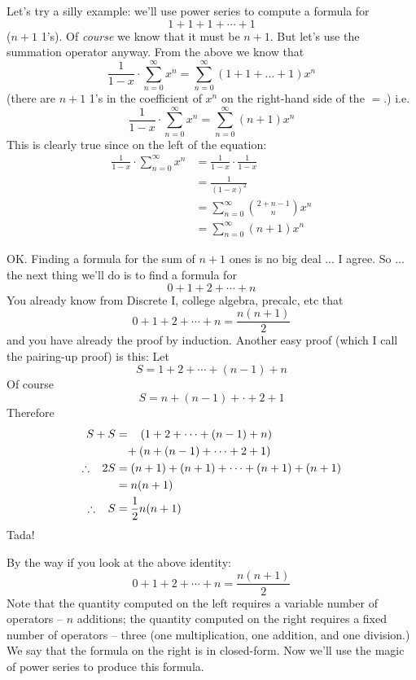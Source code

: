 Let's try a silly example:
we'll use power series to compute a formula for 
\[
1 + 1 + 1 + \cdots + 1
\]
($n+1$ 1's). Of \textit{course} we know that it must be $n+1$.
But let's use the summation operator anyway.
From the above we know that
\[
\frac{1}{1-x} \cdot \sum_{n=0}^\infty x^n = 
\sum_{n=0}^\infty (1 + 1 + \ldots + 1) x^n
\]
(there are $n + 1$ 1's in the coefficient of $x^n$ on the right-hand
side of the $=$.)
i.e.
\[
\frac{1}{1-x} \cdot \sum_{n=0}^\infty x^n = 
\sum_{n=0}^\infty (n + 1) x^n
\]
This is clearly true since on the left of the equation:
\begin{align*}
\frac{1}{1-x} \cdot \sum_{n=0}^\infty x^n 
&= \frac{1}{1-x} \cdot \frac{1}{1-x} \\
&= \frac{1}{(1-x)^2} \\
&= \sum_{n=0}^\infty \binom{2 + n - 1}{n} x^n \\
&= \sum_{n=0}^\infty (n+1) x^n
\end{align*}

OK.
Finding a formula for the sum of $n+1$ ones is no big deal ... I agree.
So ... the next thing we'll do is to find a formula for
\[
0 + 1 + 2 + \cdots + n
\]
You already know from Discrete I, college algebra, precalc, etc that
\[
0 + 1 + 2 + \cdots + n = \frac{n(n+1)}{2}
\]
and you have already the proof by induction.
Another easy proof (which I call the pairing-up proof) is this:
Let
\[
S = 1 + 2 + \cdots + (n-1) + n
\]
Of course 
\[
S = n + (n-1) + \cdot + 2 + 1
\]
Therefore
\begin{align*}
S + S 
&= \hskip 0.3cm (1 + 2 + \cdots + (n - 1) + n) \\
&  \hskip 0.3cm + (n + (n-1) + \cdots + 2 + 1) \\
\therefore \,\,\,\,\, 2S
&= (n+1) + (n+1) + \cdots + (n+1) + (n+1) \\
&= n(n+1) \\
\therefore \,\,\,\,\, S 
&= \frac{1}{2}n(n+1)
\end{align*}
Tada!

By the way if you look at the above identity:
\[
0 + 1 + 2 + \cdots + n = \frac{n(n+1)}{2}
\]
Note that the quantity computed on the left requires a variable
number of operators -- $n$ additions;
the quantity computed on the right requires a fixed number of operators
-- three (one multiplication, one addition, and one division.)
We say that the formula on the right is in closed-form.
Now we'll use the magic of power series to produce this formula.

